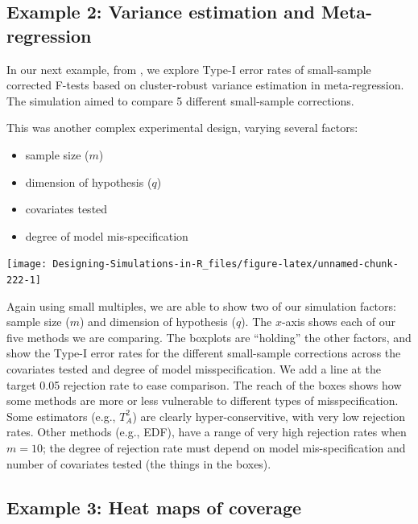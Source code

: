 \documentclass[
]{book}
\providecommand{\tightlist}{%
  \setlength{\itemsep}{0pt}\setlength{\parskip}{0pt}}
\begin{document}
\subsection{Example 2: Variance estimation and Meta-regression}\label{example-2-variance-estimation-and-meta-regression}

In our next example, from \citet{tipton2015small}, we explore Type-I error rates of small-sample corrected F-tests based on cluster-robust variance estimation in meta-regression.
The simulation aimed to compare 5 different small-sample corrections.

This was another complex experimental design, varying several factors:

\begin{itemize}
\tightlist
\item
  sample size (\(m\))
\item
  dimension of hypothesis (\(q\))
\item
  covariates tested
\item
  degree of model mis-specification
\end{itemize}

\begin{center}\texttt{[image: Designing-Simulations-in-R\_files/figure-latex/unnamed-chunk-222-1]} \end{center}

Again using small multiples, we are able to show two of our simulation factors: sample size (\(m\)) and dimension of hypothesis (\(q\)).
The \(x\)-axis shows each of our five methods we are comparing.
The boxplots are ``holding'' the other factors, and show the Type-I error rates for the different small-sample corrections across the covariates tested and degree of model misspecification.
We add a line at the target 0.05 rejection rate to ease comparison.
The reach of the boxes shows how some methods are more or less vulnerable to different types of misspecification.
Some estimators (e.g., \(T^2_A\)) are clearly hyper-conservitive, with very low rejection rates.
Other methods (e.g., EDF), have a range of very high rejection rates when \(m = 10\); the degree of rejection rate must depend on model mis-specification and number of covariates tested (the things in the boxes).

\subsection{Example 3: Heat maps of coverage}\label{example-3-heat-maps-of-coverage}
\end{document}
